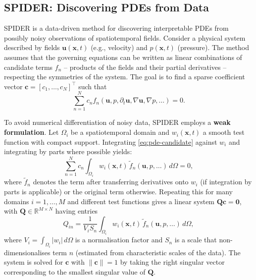 \documentclass[preprint,12pt]{elsarticle}
\begin{document}
\subsection{SPIDER: Discovering PDEs from Data}
\label{sec:spider-summary}

SPIDER \cite{gurevich2024learning} is a data-driven method for discovering interpretable PDEs from possibly noisy observations of spatiotemporal fields. Consider a physical system described by fields $\mathbf{u}(\mathbf{x},t)$ (e.g., velocity) and $p(\mathbf{x},t)$ (pressure). The method assumes that the governing equations can be written as linear combinations of candidate terms $f_n$ -- products of the fields and their partial derivatives -- respecting the symmetries of the system. The goal is to find a sparse coefficient vector $\mathbf{c}=[c_1,\dots,c_N]^\top$ such that
\begin{equation}
\label{eq:pde-candidate}
\sum_{n=1}^N c_n f_n(\mathbf{u},p,\partial_t\mathbf{u},\nabla\mathbf{u},\nabla p,\dots)=0.
\end{equation}

To avoid numerical differentiation of noisy data, SPIDER employs a \textbf{weak formulation}. Let $\Omega_i$ be a spatiotemporal domain and $w_i(\mathbf{x},t)$ a smooth test function with compact support. Integrating \eqref{eq:pde-candidate} against $w_i$ and integrating by parts where possible yields:
\begin{equation}
\label{eq:weak-formulation}
\sum_{n=1}^N c_n \int_{\Omega_i} w_i(\mathbf{x},t)\,\tilde{f}_n(\mathbf{u},p,\dots)\,d\Omega = 0,
\end{equation}
where $\tilde{f}_n$ denotes the term after transferring derivatives onto $w_i$ (if integration by parts is applicable) or the original term otherwise. Repeating this for many domains $i=1,\dots,M$ and different test functions gives a linear system $\mathbf{Q}\mathbf{c}=\mathbf{0}$, with $\mathbf{Q}\in\mathbb{R}^{M\times N}$ having entries
\begin{equation}
\label{eq:feature-matrix-spider}
Q_{in} = \frac{1}{V_i S_n}\int_{\Omega_i} w_i(\mathbf{x},t)\,\tilde{f}_n(\mathbf{u},p,\dots)\,d\Omega,
\end{equation}
where $V_i=\int_{\Omega_i}|w_i|\,d\Omega$ is a normalisation factor and $S_n$ is a scale that non-dimensionalises term $n$ (estimated from characteristic scales of the data). The system is solved for $\mathbf{c}$ with $\|\mathbf{c}\|=1$ by taking the right singular vector corresponding to the smallest singular value of $\mathbf{Q}$.
\end{document}
